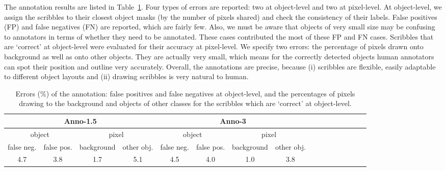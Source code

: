 The annotation results  are
listed in Table~\ref{table:anno}. Four types of errors are reported:
two at object-level and two at pixel-level. At object-level, we assign
the scribbles to their closest object masks (by the number of pixels
shared) and check the consistency of their labels. False positives (FP) and
false negatives (FN) are reported, which are fairly few. Also, we must be
aware that objects of very small size may be confusing to annotators
in terms of whether they need to be annotated. These cases
contributed the most of these FP and FN cases. Scribbles that are
`correct' at object-level were evaluated for their accuracy at
pixel-level. We specify two errors: the percentage of pixels drawn
onto background as well as onto other objects. They are actually very
small, which means for the correctly detected objects human annotators can spot
their position and outline very accurately.  Overall, the annotations are precise, because (i) scribbles are flexible,  easily adaptable to different object layouts and (ii) drawing scribbles is very natural to human.


\begin{table}[tb] %
\setlength\tabcolsep{1mm}
   \centering \small
  \begin{tabular}{|c|c|c|c|c|c|c|c|c|c|c|c|c|c|c|c|}  
    \hline \multicolumn{4}{|c|}{Anno-1.5} & \multicolumn{4}{c|}{Anno-3}  \\ \hline
     \multicolumn{2}{|c|}{object} & \multicolumn{2}{c|}{pixel} & \multicolumn{2}{c|}{object} & \multicolumn{2}{c|}{pixel} \\ \hline
      false neg. & false pos. & background  & other obj. & false neg. & false pos. & background  & other obj.   \\ \hline
     4.7   & 3.8 &     1.7          & 5.1   &  4.5   & 4.0 &     1.0            & 3.8  \\  \hline
       \end{tabular}
       \caption{Errors (\%) of the annotation: false positives and false negatives  at object-level, and the percentages of pixels drawing to the background and objects of other classes for the scribbles which are `correct' at object-level. 
}
    \label{table:anno}         
   \end{table}



